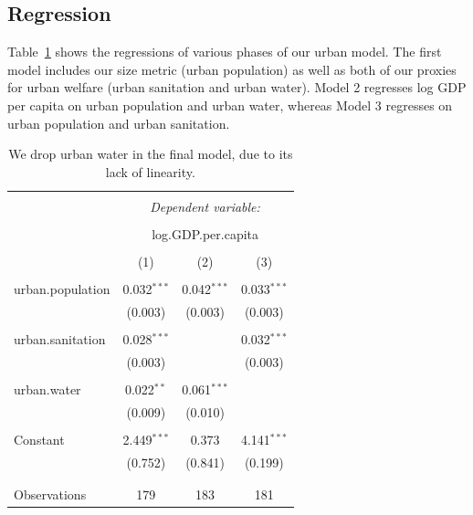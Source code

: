 \documentclass[11pt]{article}
\begin{document}
\subsection{Regression}

Table~\ref{urban_model_regressions} shows the regressions of various phases of our urban model.
The first model includes our size metric (urban population) as well as both of our proxies for urban welfare (urban sanitation and urban water).
Model 2 regresses log GDP per capita on urban population and urban water, whereas Model 3 regresses on urban population and urban sanitation.

\begin{table}[!htbp] \centering 
  \caption{We drop urban water in the final model, due to its lack of linearity.}
  \label{urban_model_regressions} 
\begin{tabular}{@{\extracolsep{5pt}}lccc} 
\\[-1.8ex]\hline 
\hline \\[-1.8ex] 
 & \multicolumn{3}{c}{\textit{Dependent variable:}} \\ 
\cline{2-4} 
\\[-1.8ex] & \multicolumn{3}{c}{log.GDP.per.capita} \\ 
\\[-1.8ex] & (1) & (2) & (3)\\ 
\hline \\[-1.8ex] 
 urban.population & 0.032$^{***}$ & 0.042$^{***}$ & 0.033$^{***}$ \\ 
  & (0.003) & (0.003) & (0.003) \\ 
  & & & \\ 
 urban.sanitation & 0.028$^{***}$ &  & 0.032$^{***}$ \\ 
  & (0.003) &  & (0.003) \\ 
  & & & \\ 
 urban.water & 0.022$^{**}$ & 0.061$^{***}$ &  \\ 
  & (0.009) & (0.010) &  \\ 
  & & & \\ 
 Constant & 2.449$^{***}$ & 0.373 & 4.141$^{***}$ \\ 
  & (0.752) & (0.841) & (0.199) \\ 
  & & & \\ 
\hline \\[-1.8ex] 
Observations & 179 & 183 & 181 \\ 

\end{tabular}
\end{table}
\end{document}
